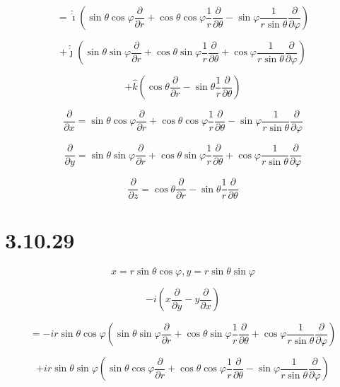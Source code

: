 \documentclass[12pt]{article}
\begin{document}
\[
    = \hat{\dot{\imath}}
    \left(
    \sin{\theta} \cos{\varphi} \frac{\partial}{\partial r}
    + \cos{\theta} \cos{\varphi} \frac{1}{r} \frac{\partial}{\partial \theta}
    - \sin{\varphi} \frac{1}{r \sin{\theta}} \frac{\partial}{\partial \varphi}
    \right)
\]

\[
    + \hat{\dot{\jmath}}
    \left(
    \sin{\theta} \sin{\varphi} \frac{\partial}{\partial r}
    + \cos{\theta} \sin{\varphi} \frac{1}{r} \frac{\partial}{\partial \theta}
    + \cos{\varphi} \frac{1}{r \sin{\theta}} \frac{\partial}{\partial \varphi}
    \right)
\]

\[
    + \hat{k} \left(\cos{\theta} \frac{\partial}{\partial r}
    - \sin{\theta} \frac{1}{r} \frac{\partial}{\partial \theta} \right)
\]

\[
    \frac{\partial}{\partial x} = \sin{\theta} \cos{\varphi} \frac{\partial}{\partial r}
    + \cos{\theta} \cos{\varphi} \frac{1}{r} \frac{\partial}{\partial \theta}
    - \sin{\varphi} \frac{1}{r \sin{\theta}} \frac{\partial}{\partial \varphi}
\]

\[
    \frac{\partial}{\partial y} = \sin{\theta} \sin{\varphi} \frac{\partial}{\partial r}
    + \cos{\theta} \sin{\varphi} \frac{1}{r} \frac{\partial}{\partial \theta}
    + \cos{\varphi} \frac{1}{r \sin{\theta}} \frac{\partial}{\partial \varphi}
\]

\[
    \frac{\partial}{\partial z} = \cos{\theta} \frac{\partial}{\partial r}
    - \sin{\theta} \frac{1}{r} \frac{\partial}{\partial \theta}
\]

\section{3.10.29}

\[
    x = r \sin{\theta} \cos{\varphi}, y = r \sin{\theta} \sin{\varphi}
\]

\[
    -i \left(x \frac{\partial}{\partial y} - y \frac{\partial}{\partial x}\right)
\]

\[
    =
    -i r \sin{\theta} \cos{\varphi}
    \left(
    \sin{\theta} \sin{\varphi} \frac{\partial}{\partial r}
    + \cos{\theta} \sin{\varphi} \frac{1}{r} \frac{\partial}{\partial \theta}
    + \cos{\varphi} \frac{1}{r \sin{\theta}} \frac{\partial}{\partial \varphi}
    \right)
\]

\[
    + i r \sin{\theta} \sin{\varphi}
    \left(
    \sin{\theta} \cos{\varphi} \frac{\partial}{\partial r}
    + \cos{\theta} \cos{\varphi} \frac{1}{r} \frac{\partial}{\partial \theta}
    - \sin{\varphi} \frac{1}{r \sin{\theta}} \frac{\partial}{\partial \varphi}
    \right)
\]
\end{document}
